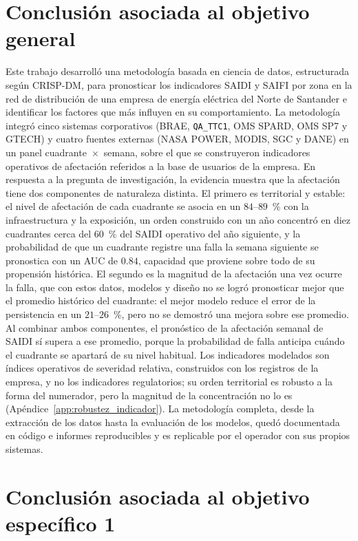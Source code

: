 
\section{Conclusión asociada al objetivo general}

Este trabajo desarrolló una metodología basada en ciencia de datos, estructurada según CRISP-DM, para pronosticar los indicadores SAIDI y SAIFI por zona en la red de distribución de una empresa de energía eléctrica del Norte de Santander e identificar los factores que más influyen en su comportamiento. La metodología integró cinco sistemas corporativos (BRAE, \texttt{QA\_TTC1}, OMS SPARD, OMS SP7 y GTECH) y cuatro fuentes externas (NASA POWER, MODIS, SGC y DANE) en un panel cuadrante~$\times$~semana, sobre el que se construyeron indicadores operativos de afectación referidos a la base de usuarios de la empresa. En respuesta a la pregunta de investigación, la evidencia muestra que la afectación tiene dos componentes de naturaleza distinta. El primero es territorial y estable: el nivel de afectación de cada cuadrante se asocia en un $84$--$89$~\% con la infraestructura y la exposición, un orden construido con un año concentró en diez cuadrantes cerca del $60$~\% del SAIDI operativo del año siguiente, y la probabilidad de que un cuadrante registre una falla la semana siguiente se pronostica con un AUC de $0{.}84$, capacidad que proviene sobre todo de su propensión histórica. El segundo es la magnitud de la afectación una vez ocurre la falla, que con estos datos, modelos y diseño no se logró pronosticar mejor que el promedio histórico del cuadrante: el mejor modelo reduce el error de la persistencia en un $21$--$26$~\%, pero no se demostró una mejora sobre ese promedio. Al combinar ambos componentes, el pronóstico de la afectación semanal de SAIDI sí supera a ese promedio, porque la probabilidad de falla anticipa cuándo el cuadrante se apartará de su nivel habitual. Los indicadores modelados son índices operativos de severidad relativa, construidos con los registros de la empresa, y no los indicadores regulatorios; su orden territorial es robusto a la forma del numerador, pero la magnitud de la concentración no lo es (Apéndice~\ref{app:robustez_indicador}). La metodología completa, desde la extracción de los datos hasta la evaluación de los modelos, quedó documentada en código e informes reproducibles y es replicable por el operador con sus propios sistemas.

\section{Conclusión asociada al objetivo específico 1}

